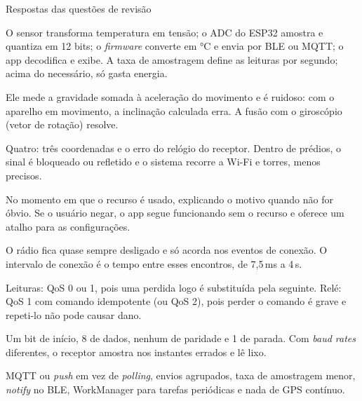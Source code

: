 \documentclass[aspectratio=169,10pt]{beamer}
\begin{document}
\begin{frame}{Respostas das questões de revisão}
  \begin{respostas}
    \item O sensor transforma temperatura em tensão; o ADC do ESP32 amostra e quantiza em 12 bits; o \emph{firmware} converte em °C e envia por BLE ou MQTT; o app decodifica e exibe. A taxa de amostragem define as leituras por segundo; acima do necessário, só gasta energia.
    \item Ele mede a gravidade somada à aceleração do movimento e é ruidoso: com o aparelho em movimento, a inclinação calculada erra. A fusão com o giroscópio (vetor de rotação) resolve.
    \item Quatro: três coordenadas e o erro do relógio do receptor. Dentro de prédios, o sinal é bloqueado ou refletido e o sistema recorre a Wi-Fi e torres, menos precisos.
    \item No momento em que o recurso é usado, explicando o motivo quando não for óbvio. Se o usuário negar, o app segue funcionando sem o recurso e oferece um atalho para as configurações.
    \item O rádio fica quase sempre desligado e só acorda nos eventos de conexão. O intervalo de conexão é o tempo entre esses encontros, de 7,5\,ms a 4\,s.
    \item Leituras: QoS 0 ou 1, pois uma perdida logo é substituída pela seguinte. Relé: QoS 1 com comando idempotente (ou QoS 2), pois perder o comando é grave e repeti-lo não pode causar dano.
    \item Um bit de início, 8 de dados, nenhum de paridade e 1 de parada. Com \emph{baud rates} diferentes, o receptor amostra nos instantes errados e lê lixo.
    \item MQTT ou \emph{push} em vez de \emph{polling}, envios agrupados, taxa de amostragem menor, \emph{notify} no BLE, WorkManager para tarefas periódicas e nada de GPS contínuo.
  \end{respostas}
\end{frame}

\end{document}
